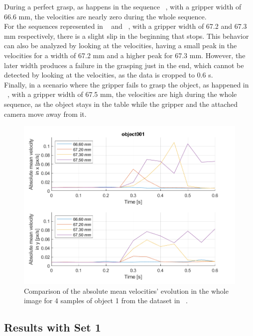 During a perfect grasp, as happens in the sequence ~, with a gripper width of 66.6 mm, the velocities are nearly zero during the whole sequence.\\

For the sequences represented in ~ and ~, with a gripper width of 67.2 and 67.3 mm respectively, there is a slight slip in the beginning that stops. This behavior can also be analyzed by looking at the velocities, having a small peak in the velocities for a width of 67.2 mm and a higher peak for 67.3 mm. However, the later width produces a failure in the grasping just in the end, which cannot be detected by looking at the velocities, as the data is cropped to 0.6 s.\\

Finally, in a scenario where the gripper fails to grasp the object, as happened in ~, with a gripper width of 67.5 mm, the velocities are high during the whole sequence, as the object stays in the table while the gripper and the attached camera move away from it.

\begin{figure}[h]
    \centering
    \includegraphics[width=\textwidth]{resources/images/gelsight_of}
    \caption{Comparison of the absolute mean velocities' evolution in the whole image for 4 samples of object 1 from the dataset in ~\cite{gelsight2018}.}\label{fig:gelsight_of}
\end{figure}

\subsection{Results with Set 1}

